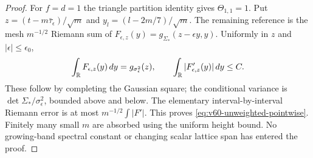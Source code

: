 \begin{proof}
For $f=d=1$ the triangle partition identity gives $\Theta_{1,1}=1$.
Put $z=(t-m\bar\tau_\epsilon)/\sqrt m$ and
$y_l=(l-2m/7)/\sqrt m$. The remaining reference is the mesh
$m^{-1/2}$ Riemann sum of $F_{\epsilon,z}(y)=g_{\Sigma_*}(z-\epsilon y,y)$.
Uniformly in $z$ and $|\epsilon|\le\epsilon_0$,
\[
 \int_\mathbb R F_{\epsilon,z}(y)\,dy=g_{\sigma_\epsilon^2}(z),\qquad
 \int_\mathbb R |F'_{\epsilon,z}(y)|\,dy\le C.
\]
These follow by completing the Gaussian square; the conditional variance
is $\det\Sigma_*/\sigma_\epsilon^2$, bounded above and below.
The elementary interval-by-interval Riemann error is at most
$m^{-1/2}\int|F'|$. This proves \eqref{eq:v60-unweighted-pointwise}.
Finitely many small $m$ are absorbed using the uniform height bound.
No growing-band spectral constant or changing scalar lattice span
has entered the proof.
\end{proof}
